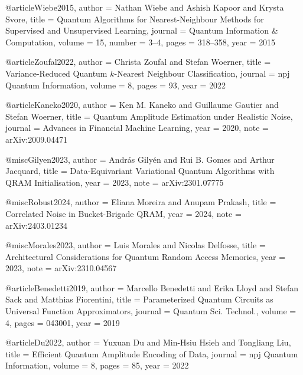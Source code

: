 \documentclass[11pt]{article}
\begin{document}
@article{Wiebe2015,
  author  = {Nathan Wiebe and Ashish Kapoor and Krysta Svore},
  title   = {Quantum Algorithms for Nearest-Neighbour Methods for Supervised and Unsupervised Learning},
  journal = {Quantum Information \& Computation},
  volume  = {15},
  number  = {3--4},
  pages   = {318--358},
  year    = {2015}
}

@article{Zoufal2022,
  author  = {Christa Zoufal and Stefan Woerner},
  title   = {Variance-Reduced Quantum $k$-Nearest Neighbour Classification},
  journal = {npj Quantum Information},
  volume  = {8},
  pages   = {93},
  year    = {2022}
}

@article{Kaneko2020,
  author  = {Ken M. Kaneko and Guillaume Gautier and Stefan Woerner},
  title   = {Quantum Amplitude Estimation under Realistic Noise},
  journal = {Advances in Financial Machine Learning},
  year    = {2020},
  note    = {arXiv:2009.04471}
}

@misc{Gilyen2023,
  author = {András Gilyén and Rui B. Gomes and Arthur Jacquard},
  title  = {Data-Equivariant Variational Quantum Algorithms with QRAM Initialisation},
  year   = {2023},
  note   = {arXiv:2301.07775}
}

@misc{Robust2024,
  author = {Eliana Moreira and Anupam Prakash},
  title  = {Correlated Noise in Bucket-Brigade QRAM},
  year   = {2024},
  note   = {arXiv:2403.01234}
}

@misc{Morales2023,
  author = {Luis Morales and Nicolas Delfosse},
  title  = {Architectural Considerations for Quantum Random Access Memories},
  year   = {2023},
  note   = {arXiv:2310.04567}
}

@article{Benedetti2019,
  author  = {Marcello Benedetti and Erika Lloyd and Stefan Sack and Matthias Fiorentini},
  title   = {Parameterized Quantum Circuits as Universal Function Approximators},
  journal = {Quantum Sci. Technol.},
  volume  = {4},
  pages   = {043001},
  year    = {2019}
}

@article{Du2022,
  author  = {Yuxuan Du and Min-Hsiu Hsieh and Tongliang Liu},
  title   = {Efficient Quantum Amplitude Encoding of Data},
  journal = {npj Quantum Information},
  volume  = {8},
  pages   = {85},
  year    = {2022}
}

%
\end{document}
